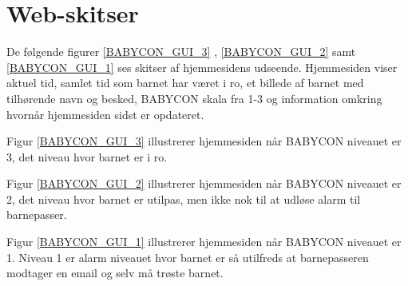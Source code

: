 \section{Web-skitser}


De følgende figurer \ref{BABYCON_GUI_3} , \ref{BABYCON_GUI_2} samt \ref{BABYCON_GUI_1} ses skitser af hjemmesidens udseende. Hjemmesiden viser aktuel tid, samlet tid som barnet har været i ro, et billede af barnet med tilhørende navn og besked, BABYCON skala fra 1-3 og information omkring hvornår hjemmesiden sidst er opdateret.


Figur \ref{BABYCON_GUI_3} illustrerer hjemmesiden når BABYCON niveauet er 3, det niveau hvor barnet er i ro.


Figur \ref{BABYCON_GUI_2} illustrerer hjemmesiden når BABYCON niveauet er 2, det niveau hvor barnet er utilpas, men ikke nok til at udløse alarm til barnepasser.


Figur \ref{BABYCON_GUI_1} illustrerer hjemmesiden når BABYCON niveauet er 1. Niveau 1 er alarm niveauet hvor barnet er så utilfreds at barnepasseren modtager en email og selv må trøste barnet.